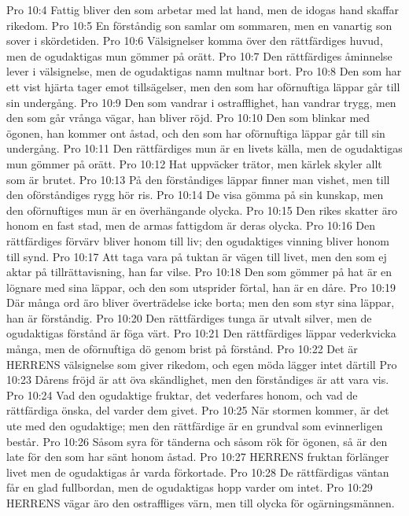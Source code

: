 Pro 10:4  Fattig bliver den som arbetar med lat hand, men de idogas hand skaffar rikedom.
Pro 10:5  En förståndig son samlar om sommaren, men en vanartig son sover i skördetiden.
Pro 10:6  Välsignelser komma över den rättfärdiges huvud, men de ogudaktigas mun gömmer på orätt.
Pro 10:7  Den rättfärdiges åminnelse lever i välsignelse, men de ogudaktigas namn multnar bort.
Pro 10:8  Den som har ett vist hjärta tager emot tillsägelser, men den som har oförnuftiga läppar går till sin undergång.
Pro 10:9  Den som vandrar i ostrafflighet, han vandrar trygg, men den som går vrånga vägar, han bliver röjd.
Pro 10:10  Den som blinkar med ögonen, han kommer ont åstad, och den som har oförnuftiga läppar går till sin undergång.
Pro 10:11  Den rättfärdiges mun är en livets källa, men de ogudaktigas mun gömmer på orätt.
Pro 10:12  Hat uppväcker trätor, men kärlek skyler allt som är brutet.
Pro 10:13  På den förståndiges läppar finner man vishet, men till den oförståndiges rygg hör ris.
Pro 10:14  De visa gömma på sin kunskap, men den oförnuftiges mun är en överhängande olycka.
Pro 10:15  Den rikes skatter äro honom en fast stad, men de armas fattigdom är deras olycka.
Pro 10:16  Den rättfärdiges förvärv bliver honom till liv; den ogudaktiges vinning bliver honom till synd.
Pro 10:17  Att taga vara på tuktan är vägen till livet, men den som ej aktar på tillrättavisning, han far vilse.
Pro 10:18  Den som gömmer på hat är en lögnare med sina läppar, och den som utsprider förtal, han är en dåre.
Pro 10:19  Där många ord äro bliver överträdelse icke borta; men den som styr sina läppar, han är förståndig.
Pro 10:20  Den rättfärdiges tunga är utvalt silver, men de ogudaktigas förstånd är föga värt.
Pro 10:21  Den rättfärdiges läppar vederkvicka många, men de oförnuftiga dö genom brist på förstånd.
Pro 10:22  Det är HERRENS välsignelse som giver rikedom, och egen möda lägger intet därtill
Pro 10:23  Dårens fröjd är att öva skändlighet, men den förståndiges är att vara vis.
Pro 10:24  Vad den ogudaktige fruktar, det vederfares honom, och vad de rättfärdiga önska, del varder dem givet.
Pro 10:25  När stormen kommer, är det ute med den ogudaktige; men den rättfärdige är en grundval som evinnerligen består.
Pro 10:26  Såsom syra för tänderna och såsom rök för ögonen, så är den late för den som har sänt honom åstad.
Pro 10:27  HERRENS fruktan förlänger livet men de ogudaktigas år varda förkortade.
Pro 10:28  De rättfärdigas väntan får en glad fullbordan, men de ogudaktigas hopp varder om intet.
Pro 10:29  HERRENS vägar äro den ostraffliges värn, men till olycka för ogärningsmännen.
